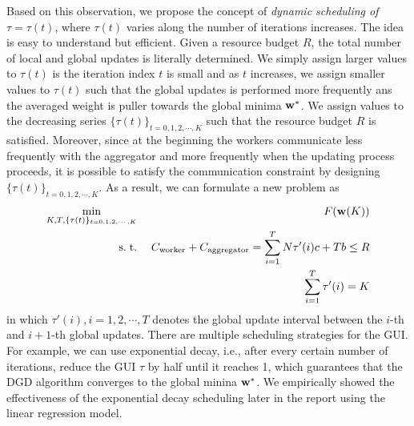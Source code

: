 \documentclass[11pt, fullpage,letterpaper]{article}
\newcommand{\bw}{{\bf w}}
\begin{document}
\begin{enumerate}
\begin{enumerate}
Based on this observation, we propose the concept of \emph{dynamic scheduling of $\tau =\tau(t)$}, where $\tau(t)$ varies along the number of iterations increases. The idea is easy to understand but efficient. Given a resource budget $R$, the total number of local and global updates is literally determined. We simply assign larger values to $\tau(t)$ is the iteration index $t$ is small and as $t$ increases, we assign smaller values to $\tau(t)$ such that the global updates is performed more frequently ans the averaged weight is  puller towards the global minima $\bw^*$. We assign values to the decreasing series $\{\tau(t)\}_{t=0,1,2,\cdots,K}$ such that the resource budget $R$ is satisfied. Moreover, since at the beginning the workers communicate less frequently with the aggregator and more frequently when the updating process proceeds, it is possible to satisfy the communication constraint by designing $\{\tau(t)\}_{t=0,1,2,\cdots,K}$. As a result, we can formulate a new problem as
\begin{eqnarray}
\min_{K, T, \{\tau(t)\}_{t=0,1,2,\cdots,K}} & \;& F(\bw(K))\\
{\rm s.\;t.} &\;& C_{\rm worker} +C_{\rm aggregator}= \sum_{i=1}^TN\tau'(i)c+Tb \le R\\
&\;&  \sum_{i=1}^{T}\tau'(i) =K
\end{eqnarray}
in which $\tau'(i), i=1,2,\cdots,T$ denotes the global update interval between the $i$-th and $i+1$-th global updates. There are multiple scheduling strategies for the GUI. For example, we can use exponential decay, i.e., after every certain number of iterations, reduce the GUI $\tau$ by half until it reaches 1, which guarantees that the DGD algorithm converges to the global minina $\bw^*$. We empirically showed the effectiveness of the exponential decay scheduling later in the report using the linear regression model.

\end{enumerate}
\end{enumerate}
\end{document}
